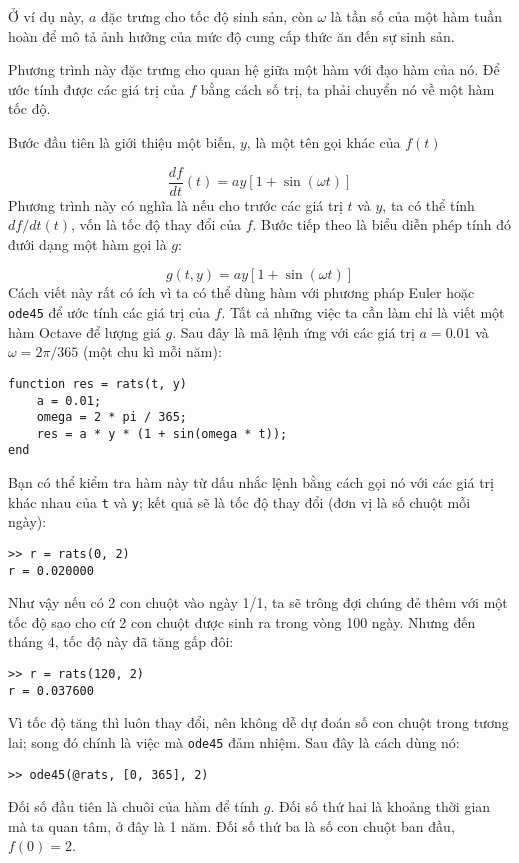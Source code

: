 \documentclass[12pt]{book}
\begin{document}
Ở ví dụ này, $a$ đặc trưng cho tốc độ sinh sản, còn $\omega$
là tần số của một hàm tuần hoàn để mô tả ảnh hưởng của mức
độ cung cấp thức ăn đến sự sinh sản.

Phương trình này đặc trưng cho quan hệ giữa một hàm với
đạo hàm của nó. Để ước tính được các giá trị của $f$ bằng cách
số trị, ta phải chuyển nó về một hàm tốc độ.

Bước đầu tiên là giới thiệu một biến, $y$, là một tên gọi khác 
của $f(t)$

\[ \frac{df}{dt}(t) = a y \left[1 + \sin (\omega t) \right] \]
%
Phương trình này có nghĩa là nếu cho trước các giá trị $t$ và $y$, 
ta có thể tính $df/dt(t)$, vốn là tốc độ thay đổi của $f$. Bước
tiếp theo là biểu diễn phép tính đó đưới dạng một hàm gọi là $g$:

\[ g(t, y) = a y \left[1 + \sin (\omega t) \right] \]
%
Cách viết này rất có ích vì ta có thể dùng hàm với phương pháp
Euler hoặc {\tt ode45} để ước tính các giá trị của $f$. Tất cả những
việc ta cần làm chỉ là viết một hàm Octave để lượng giá $g$. 
Sau đây là mã lệnh ứng với các giá trị $a = 0.01$ và 
$\omega = 2 \pi/365$ (một chu kì mỗi năm):

\begin{verbatim}
function res = rats(t, y)
    a = 0.01;
    omega = 2 * pi / 365;
    res = a * y * (1 + sin(omega * t));
end
\end{verbatim}
%
Bạn có thể kiểm tra hàm này từ dấu nhắc lệnh bằng cách 
gọi nó với các giá trị khác nhau của {\tt t} và {\tt y}; kết quả sẽ là
tốc độ thay đổi (đơn vị là số chuột mỗi ngày):

\begin{verbatim}
>> r = rats(0, 2)
r = 0.020000
\end{verbatim}
%
Như vậy nếu có 2 con chuột vào ngày 1/1, ta sẽ trông đợi chúng
đẻ thêm với một tốc độ sao cho cứ 2 con chuột được sinh ra trong
vòng 100 ngày. Nhưng đến tháng 4, tốc độ này đã tăng gấp đôi:

\begin{verbatim}
>> r = rats(120, 2)
r = 0.037600
\end{verbatim}

Vì tốc độ tăng thì luôn thay đổi, nên không dễ dự đoán số con 
chuột trong tương lai; song đó chính là việc mà {\tt ode45} đảm nhiệm.
Sau đây là cách dùng nó:

\begin{verbatim}
>> ode45(@rats, [0, 365], 2)
\end{verbatim}
%
Đối số đầu tiên là chuôi của hàm để tính $g$. Đối số thứ hai là khoảng
thời gian mà ta quan tâm, ở đây là 1 năm. Đối số thứ ba là số con chuột
ban đầu, $f(0) = 2$.
\end{document}
